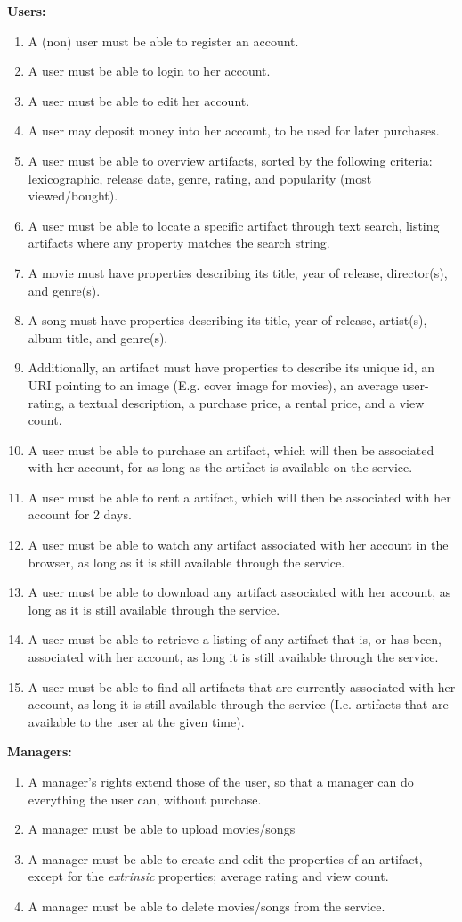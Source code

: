 \textbf{Users:}
\begin{enumerate}
\item A (non) user must be able to register an account.
\item A user must be able to login to her account.
\item A user must be able to edit her account.
\item A user may deposit money into her account, to be used for later
	purchases.
\item A user must be able to overview artifacts, sorted by the following
	criteria: lexicographic, release date, genre, rating, and
	popularity (most viewed/bought).
\item A user must be able to locate a specific artifact through text search,
	listing artifacts where any property matches the search string.
\item A movie must have properties describing its title, year of
	release, director(s), and genre(s).
\item A song must have properties describing its title, year of
	release, artist(s), album title,  and genre(s).
\item Additionally, an artifact must have properties to describe its unique id,
	an URI pointing to an image (E.g. cover image for movies), an average
	user-rating, a textual description, a purchase price, a rental price,
	and a view count.
\item A user must be able to purchase an artifact, which will then be associated
	with her account, for as long as the artifact is available on the
	service.
\item A user must be able to rent a artifact, which will then be associated
	with her account for 2 days.
\item A user must be able to watch any artifact associated with her account
	in the browser, as long as it is still available through the service.
\item A user must be able to download any artifact associated with her account,
	as long as it is still available through the service.
\item A user must be able to retrieve a listing of any artifact that is, or has
	been, associated with her account, as long it is still available through
	the service.
\item A user must be able to find all artifacts that are currently associated
	with her account, as long it is still available through the service (I.e.
	artifacts that are available to the user at the given time).
\end{enumerate}
\textbf{Managers:}
\begin{enumerate}
\item A manager's rights extend those of the user, so that a manager can do
	everything the user can, without purchase.
\item A manager must be able to upload movies/songs
\item A manager must be able to create and edit the properties of an artifact,
	except for the \emph{extrinsic} properties; average rating and view
	count.
\item A manager must be able to delete movies/songs from the service.
\end{enumerate}

